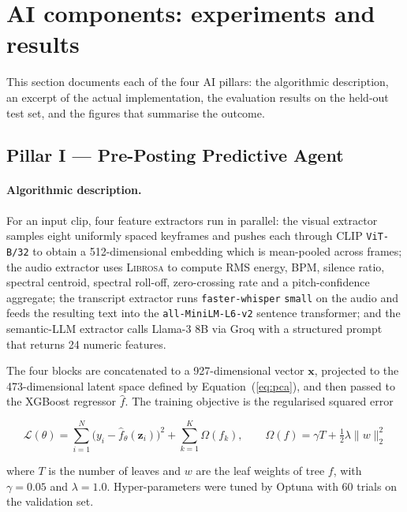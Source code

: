 \section{AI components: experiments and results}
\label{sec:ai_components}

This section documents each of the four AI pillars: the algorithmic description, an excerpt
of the actual implementation, the evaluation results on the held-out test set, and the
figures that summarise the outcome.

\subsection{Pillar I --- Pre-Posting Predictive Agent}
\label{sec:pillar1}

\paragraph{Algorithmic description.}
For an input clip, four feature extractors run in parallel: the visual extractor samples
eight uniformly spaced keyframes and pushes each through CLIP \texttt{ViT-B/32} to obtain
a 512-dimensional embedding which is mean-pooled across frames; the audio extractor uses
\textsc{Librosa} to compute RMS energy, BPM, silence ratio, spectral centroid, spectral
roll-off, zero-crossing rate and a pitch-confidence aggregate; the transcript extractor runs
\texttt{faster-whisper} \texttt{small} on the audio and feeds the resulting text into the
\texttt{all-MiniLM-L6-v2} sentence transformer; and the semantic-LLM extractor calls
Llama-3 8B via Groq with a structured prompt that returns 24 numeric features.

The four blocks are concatenated to a 927-dimensional vector $\mathbf{x}$, projected to the
473-dimensional latent space defined by Equation~(\ref{eq:pca}), and then passed to the
XGBoost regressor $\hat{f}$. The training objective is the regularised squared error

\begin{equation}
\mathcal{L}(\theta) = \sum_{i=1}^{N} \bigl(y_i - \hat{f}_\theta(\mathbf{z}_i)\bigr)^{2}
                 + \sum_{k=1}^{K} \Omega(f_k),
\qquad
\Omega(f) = \gamma T + \tfrac{1}{2}\lambda \|w\|_2^{2}
\label{eq:xgb}
\end{equation}

where $T$ is the number of leaves and $w$ are the leaf weights of tree $f$, with
$\gamma=0.05$ and $\lambda=1.0$. Hyper-parameters were tuned by Optuna with 60 trials on the
validation set.

